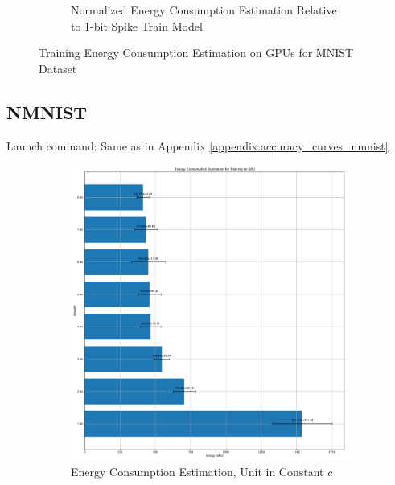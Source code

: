 \begin{figure}[H]
\begin{subfigure}[H]{0.48\textwidth}
                \caption{Normalized Energy Consumption Estimation Relative to 1-bit Spike Train Model}
            \end{subfigure}
            \caption{Training Energy Consumption Estimation on GPUs for MNIST Dataset}
        \end{figure}

    \subsection{NMNIST}
    \label{appendix:energy_gpu_nmnist}
        Launch command: Same as in Appendix \ref{appendix:accuracy_curves_nmnist}

        \begin{figure}[H]
            \centering
            \begin{subfigure}[H]{0.48\textwidth}
                \includegraphics[width=\textwidth]{../standard/NMNIST/plots/nmnist_train_energy_gpu.pdf}
                \caption{Energy Consumption Estimation, Unit in Constant $c$}
            \end{subfigure}
            \hfill
            \begin{subfigure}[H]{0.48\textwidth}

\end{subfigure}
\end{figure}
